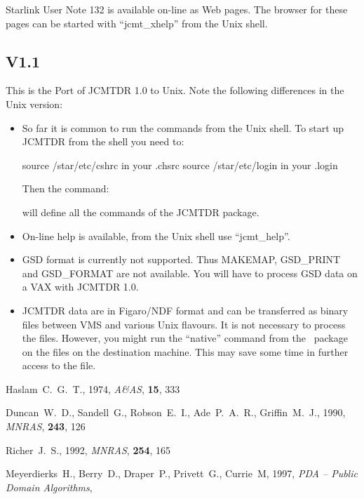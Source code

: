 \documentclass[twoside,11pt,nolof]{starlink}
\providecommand{\Kappa}{\xref{{\sc{Kappa}}}{sun95}{}}
\begin{document}
 Starlink User Note 132 is available on-line as Web pages. The browser
 for these pages can be started with ``jcmt\_xhelp'' from the Unix shell.


\subsection*{V1.1}

This is the Port of JCMTDR 1.0 to Unix. Note the following differences
in the Unix version:

\begin{itemize}
\item So far it is common to run the commands from the Unix shell. To start
   up JCMTDR from the shell you need to:

\begin{terminalv}
source /star/etc/cshrc in your .chsrc
source /star/etc/login in your .login
\end{terminalv}
   Then the command:
\begin{terminalv}
\end{terminalv}
   will define all the commands of the JCMTDR package.

\item On-line help is available, from the Unix shell use ``jcmt\_help''.

\item GSD format is currently not supported. Thus MAKEMAP, GSD\_PRINT and
   GSD\_FORMAT are not available. You will have to process GSD data on a
   VAX with JCMTDR 1.0.

\item JCMTDR data are in Figaro/NDF format and can be transferred as binary
   files between VMS and various Unix flavours. It is not necessary to
   process the files. However, you might run the ``native'' command from
   the \Kappa\ package on the files on the destination machine. This may
   save some time in further access to the file.
\end{itemize}


\begin{thebibliography}{}

Haslam~C.~G.~T., 1974, \textit{A\&AS}, \textbf{15}, 333

Duncan~W.~D., Sandell~G., Robson~E.~I., Ade~P.~A.~R., Griffin~M.~J.,
1990, \textit{MNRAS}, \textbf{243}, 126

Richer~J.~S., 1992, \textit{MNRAS}, \textbf{254}, 165

Meyerdierks~H., Berry~D., Draper~P., Privett~G., Currie~M,
1997, \textit{ PDA -- Public Domain Algorithms},

\end{thebibliography}
\end{document}
